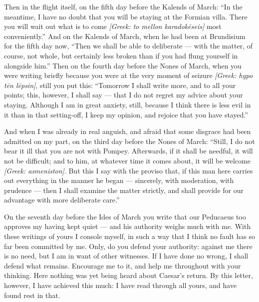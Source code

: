  Then in the flight itself, on the fifth day before the Kalends of March: ``In the meantime, I have no doubt that you will be staying at the Formian villa. There you will wait out what is to come \textit{[Greek: to mellon karadok\=eseis]} most conveniently.'' And on the Kalends of March, when he had been at Brundisium for the fifth day now, ``Then we shall be able to deliberate --- with the matter, of course, not whole, but certainly less broken than if you had flung yourself in alongside him.'' Then on the fourth day before the Nones of March, when you were writing briefly because you were at the very moment of seizure \textit{[Greek: hypo t\=en l\=epsin]}, still you put this: ``Tomorrow I shall write more, and to all your points; this, however, I shall say --- that I do not regret my advice about your staying. Although I am in great anxiety, still, because I think there is less evil in it than in that setting-off, I keep my opinion, and rejoice that you have stayed.''

 And when I was already in real anguish, and afraid that some disgrace had been admitted on my part, on the third day before the Nones of March: ``Still, I do not bear it ill that you are not with Pompey. Afterwards, if it shall be needful, it will not be difficult; and to him, at whatever time it comes about, it will be welcome \textit{[Greek: asmeniston]}. But this I say with the proviso that, if this man here carries out everything in the manner he began --- sincerely, with moderation, with prudence --- then I shall examine the matter strictly, and shall provide for our advantage with more deliberate care.''

 On the seventh day before the Ides of March you write that our Peducaeus too approves my having kept quiet --- and his authority weighs much with me. With these writings of yours I console myself, in such a way that I think no fault has so far been committed by me. Only, do you defend your authority: against me there is no need, but I am in want of other witnesses. If I have done no wrong, I shall defend what remains. Encourage me to it, and help me throughout with your thinking. Here nothing was yet being heard about Caesar's return. By this letter, however, I have achieved this much: I have read through all yours, and have found rest in that.
